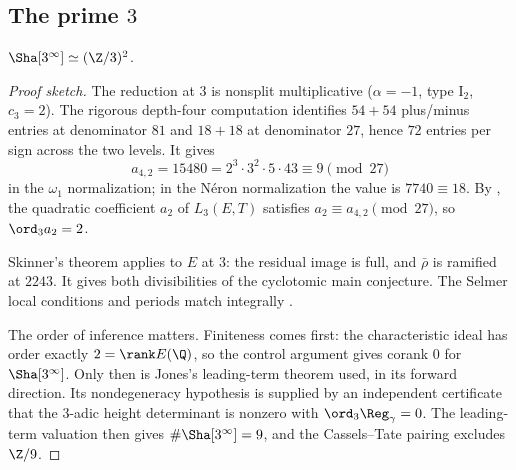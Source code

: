 \subsection[The prime 3]{The prime $3$}
\begin{theorem}\label{thm:sha3}
$\Sha[3^\infty]\simeq(\Z/3)^2$.
\end{theorem}
\begin{proof}[Proof sketch]
The reduction at $3$ is nonsplit multiplicative ($\alpha=-1$, type $\mathrm{I}_2$, $c_3=2$). The rigorous depth-four computation identifies $54+54$ plus/minus entries at denominator $81$ and $18+18$ at denominator $27$, hence $72$ entries per sign across the two levels. It gives
\[
a_{4,2}=15480=2^3\cdot3^2\cdot5\cdot43\equiv9\pmod{27}
\]
in the $\omega_1$ normalization; in the N\'eron normalization the value is $7740\equiv18$. By \cite[Prop.~3.5]{sw}, the quadratic coefficient $a_2$ of $L_3(E,T)$ satisfies $a_2\equiv a_{4,2}\pmod{27}$, so $\ord_3a_2=2$.

Skinner's theorem \cite[Thm.~A]{skinner} applies to $E$ at $3$: the residual image is full, and $\bar\rho$ is ramified at $2243$. It gives both divisibilities of the cyclotomic main conjecture. The Selmer local conditions and periods match integrally \cite{gv}.

The order of inference matters. Finiteness comes first: the characteristic ideal has order exactly $2=\rank E(\Q)$, so the control argument gives corank $0$ for $\Sha[3^\infty]$. Only then is Jones's leading-term theorem \cite[Thm.~3.1]{jones} used, in its forward direction. Its nondegeneracy hypothesis is supplied by an independent certificate that the $3$-adic height determinant is nonzero with $\ord_3\Reg_\gamma=0$. The leading-term valuation then gives $\#\Sha[3^\infty]=9$, and the Cassels--Tate pairing excludes $\Z/9$.
\end{proof}

